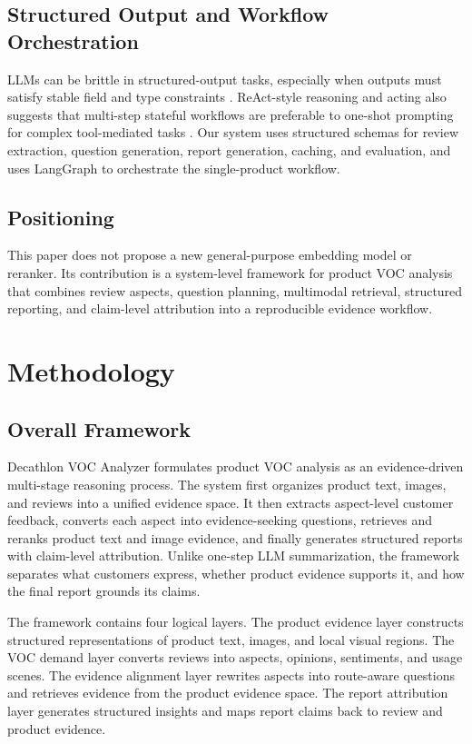\documentclass[11pt]{article}
\begin{document}
\subsection{Structured Output and Workflow Orchestration}

LLMs can be brittle in structured-output tasks, especially when outputs must satisfy stable field and type constraints \citep{liu2024structuredOutputBenchmark,geng2023grammarConstrainedDecoding}. ReAct-style reasoning and acting also suggests that multi-step stateful workflows are preferable to one-shot prompting for complex tool-mediated tasks \citep{yao2023react}. Our system uses structured schemas for review extraction, question generation, report generation, caching, and evaluation, and uses LangGraph to orchestrate the single-product workflow.

\subsection{Positioning}

This paper does not propose a new general-purpose embedding model or reranker. Its contribution is a system-level framework for product VOC analysis that combines review aspects, question planning, multimodal retrieval, structured reporting, and claim-level attribution into a reproducible evidence workflow.

\section{Methodology}
\subsection{Overall Framework}

Decathlon VOC Analyzer formulates product VOC analysis as an evidence-driven multi-stage reasoning process. The system first organizes product text, images, and reviews into a unified evidence space. It then extracts aspect-level customer feedback, converts each aspect into evidence-seeking questions, retrieves and reranks product text and image evidence, and finally generates structured reports with claim-level attribution. Unlike one-step LLM summarization, the framework separates what customers express, whether product evidence supports it, and how the final report grounds its claims.

The framework contains four logical layers. The product evidence layer constructs structured representations of product text, images, and local visual regions. The VOC demand layer converts reviews into aspects, opinions, sentiments, and usage scenes. The evidence alignment layer rewrites aspects into route-aware questions and retrieves evidence from the product evidence space. The report attribution layer generates structured insights and maps report claims back to review and product evidence.
\end{document}
